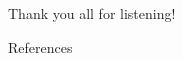 \documentclass[12pt, pdf, hyperref={draft}, usenames, dvipsnames,
aspectratio=169]{beamer}
\begin{document}

\begin{frame}[plain]
\begin{center}
  {\Huge Thank you all for listening!} \\
\end{center}
\end{frame}


\begin{frame}[t,allowframebreaks]{References}

\printbibliography[]

\end{frame}
\end{document}
